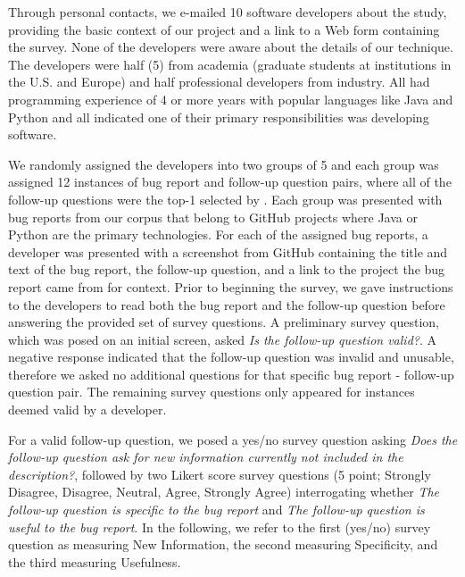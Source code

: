 Through personal contacts, we e-mailed 10 software developers about the study, providing the basic context of our project
and a link to a Web form containing the survey. None of the developers were
aware about the details of our technique. The developers were half (5) from academia (graduate students at
institutions in the U.S. and Europe) and half professional developers from industry. All had programming
experience of 4 or more years with popular languages like Java and Python and all indicated one of their primary
responsibilities was developing software.

We randomly assigned the developers into two groups of 5 and each group was assigned 12 instances of bug report and follow-up question pairs, where all of the follow-up questions were the top-1 selected by \evpi. Each group was presented with bug reports from our corpus that belong to GitHub projects where Java or Python are the primary technologies. For each of the assigned bug reports, a developer
was presented with a screenshot from GitHub containing the title and text of the bug report, the follow-up question, and a link to the project the bug report came from for context. Prior to beginning the survey, we gave instructions to the developers to read both the bug report and the follow-up question before answering the provided set of survey questions. A preliminary survey question, which was posed on an initial screen, asked {\em Is the follow-up question valid?}. A negative response indicated that the follow-up question was invalid and unusable, therefore we asked no additional questions for that specific bug report - follow-up question pair. The remaining survey questions only appeared for instances deemed valid by a developer.

For a valid follow-up question, we posed a yes/no survey question asking {\em Does the follow-up question ask for new information currently not included in the description?}, followed by two Likert score survey questions (5 point; Strongly Disagree, Disagree, Neutral, Agree, Strongly Agree) interrogating whether {\em The follow-up question is specific to the bug report} and {\em The follow-up question is useful to the bug report}. In the following, we refer to the first (yes/no) survey question as measuring New Information, the second measuring Specificity, and the third measuring Usefulness.

